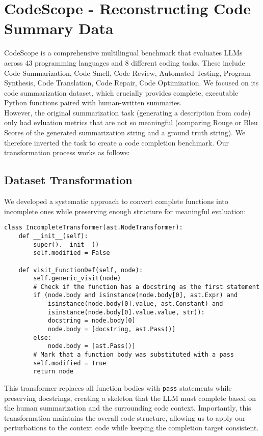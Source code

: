 \documentclass[%
thesis=student,%
coverpage=false,%
titlepage=false,%
headmarks=true, %
english,%
font=libertine, %
math=newpxtx, %
BCOR=5mm,%
coverBCOR=11mm%
]{tum-templates/book/tumbook}
\begin{document}
\section{CodeScope - Reconstructing Code Summary Data}
\label{sec:CodeScop}
CodeScope \cite{Yan2023} is a comprehensive multilingual benchmark that evaluates LLMs across 43 programming languages and 8 different coding tasks. These include Code Summarization, Code Smell, Code Review, Automated Testing, Program Synthesis, Code Translation, Code Repair, Code Optimization. We focused on its code summarization dataset, which crucially provides complete, executable Python functions paired with human-written summaries. \\
However, the original summarization task (generating a description from code) only had evluation metrics that are not so meaningful (comparing Rouge or Bleu Scores of the generated summarization string and a ground truth string). 
We therefore inverted the task to create a code completion benchmark. Our transformation process works as follows:

\subsection{Dataset Transformation}
We developed a systematic approach to convert complete functions into incomplete ones while preserving enough structure for meaningful evaluation:

\begin{lstlisting}[style=pythonstyle, caption={Function that substitutes all the existing function bodies of a module with pass statements}]
class IncompleteTransformer(ast.NodeTransformer):
    def __init__(self):
        super().__init__()
        self.modified = False

    def visit_FunctionDef(self, node):
        self.generic_visit(node)
        # Check if the function has a docstring as the first statement
        if (node.body and isinstance(node.body[0], ast.Expr) and
            isinstance(node.body[0].value, ast.Constant) and
            isinstance(node.body[0].value.value, str)):
            docstring = node.body[0]
            node.body = [docstring, ast.Pass()]
        else:
            node.body = [ast.Pass()]
        # Mark that a function body was substituted with a pass
        self.modified = True
        return node
\end{lstlisting}
This transformer replaces all function bodies with \texttt{pass} statements while preserving docstrings, creating a skeleton that the LLM must complete based on the human summarization and the surrounding code context. Importantly, this transformation maintains the overall code structure, allowing us to apply our perturbations to the context code while keeping the completion target consistent.
\end{document}

